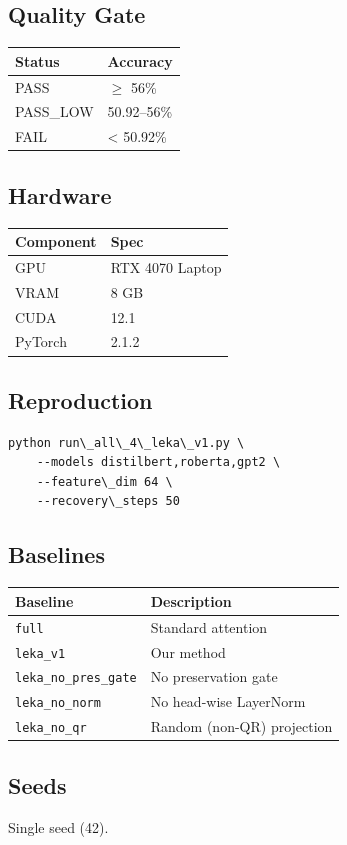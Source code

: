 \subsection{Quality Gate}

\begin{table}[H]
\centering
\small
\begin{tabular}{ll}
\toprule
\textbf{Status} & \textbf{Accuracy} \\
\midrule
PASS & $\ge$ 56\% \\
PASS\_LOW & 50.92--56\% \\
FAIL & \textless{} 50.92\% \\
\bottomrule
\end{tabular}
\end{table}

\subsection{Hardware}

\begin{table}[H]
\centering
\small
\begin{tabular}{ll}
\toprule
\textbf{Component} & \textbf{Spec} \\
\midrule
GPU & RTX 4070 Laptop \\
VRAM & 8 GB \\
CUDA & 12.1 \\
PyTorch & 2.1.2 \\
\bottomrule
\end{tabular}
\end{table}

\subsection{Reproduction}

\begin{lstlisting}
python run\_all\_4\_leka\_v1.py \
    --models distilbert,roberta,gpt2 \
    --feature\_dim 64 \
    --recovery\_steps 50
\end{lstlisting}

\subsection{Baselines}

\begin{table}[H]
\centering
\small
\begin{tabular}{ll}
\toprule
\textbf{Baseline} & \textbf{Description} \\
\midrule
\texttt{full} & Standard attention \\
\texttt{leka\_v1} & Our method \\
\texttt{leka\_no\_pres\_gate} & No preservation gate \\
\texttt{leka\_no\_norm} & No head-wise LayerNorm \\
\texttt{leka\_no\_qr} & Random (non-QR) projection \\
\bottomrule
\end{tabular}
\end{table}

\subsection{Seeds}

Single seed (42).

